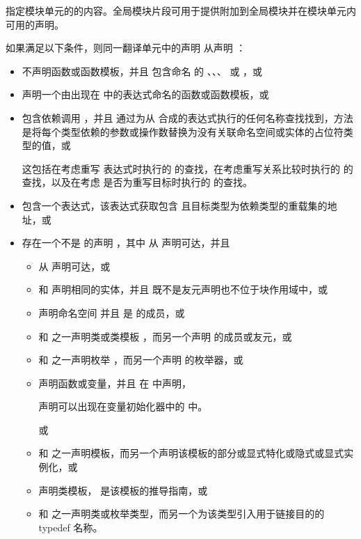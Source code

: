 \pnum
{} 指定模块单元的的内容。全局模块片段可用于提供附加到全局模块并在模块单元内可用的声明。

\pnum
如果满足以下条件，则同一翻译单元中的声明  从声明  ：
\begin{itemize}
\item
{} 不声明函数或函数模板，并且  包含命名  的 、、、 或 ，或

\item
{} 声明一个由出现在  中的表达式命名的函数或函数模板，或

\item
{} 包含依赖调用 ，并且  通过为从  合成的表达式执行的任何名称查找找到，方法是将每个类型依赖的参数或操作数替换为没有关联命名空间或实体的占位符类型的值，或
\begin{note}
这包括在考虑重写 \tcode{!=} 表达式时执行的  的查找，在考虑重写关系比较时执行的  的查找，以及在考虑  是否为重写目标时执行的  的查找。
\end{note}

\item
{} 包含一个表达式，该表达式获取包含  且目标类型为依赖类型的重载集的地址，或

\item
存在一个不是  的声明 ，其中  从  声明可达，并且
\begin{itemize}
\item
{} 从  声明可达，或
\item
{} 和  声明相同的实体，并且  既不是友元声明也不位于块作用域中，或
\item
{} 声明命名空间  并且  是  的成员，或
\item
{} 和  之一声明类或类模板 ，而另一个声明  的成员或友元，或
\item
{} 和  之一声明枚举 ，而另一个声明  的枚举器，或
\item
{} 声明函数或变量，并且  在  中声明，
\begin{footnote}
声明可以出现在变量初始化器中的  中。
\end{footnote}
或
\item
{} 和  之一声明模板，而另一个声明该模板的部分或显式特化或隐式或显式实例化，或
\item
{} 声明类模板， 是该模板的推导指南，或
\item
{} 和  之一声明类或枚举类型，而另一个为该类型引入用于链接目的的 typedef 名称。
\end{itemize}
\end{itemize}
